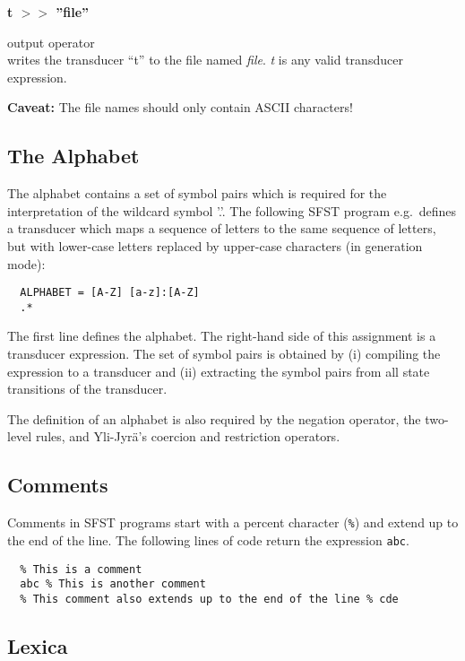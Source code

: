 \documentclass{article}
\begin{document}
\parbox[t]{2cm}{\textbf{t $>>$ ''file''}}
\begin{minipage}[t]{10cm}
  output operator\\
  writes the transducer ``t'' to the file named \emph{file}. \emph{t}
  is any valid transducer expression.
\end{minipage}

\textbf{Caveat:} The file names should only contain ASCII characters!

\subsection*{The Alphabet}

The alphabet contains a set of symbol pairs which is required for the
interpretation of the wildcard symbol '.'. The following SFST program
e.g.\ defines a transducer which maps a sequence of letters to the
same sequence of letters, but with lower-case letters replaced by
upper-case characters (in generation mode):

\begin{verbatim}
  ALPHABET = [A-Z] [a-z]:[A-Z]
  .*
\end{verbatim}

The first line defines the alphabet. The right-hand side of this
assignment is a transducer expression. The set of symbol pairs is
obtained by (i) compiling the expression to a transducer and (ii)
extracting the symbol pairs from all state transitions of the
transducer.

The definition of an alphabet is also required by the negation
operator, the two-level rules, and Yli-Jyr{\"a}'s coercion and
restriction operators.


\subsection*{Comments}

Comments in SFST programs start with a percent character (\verb#%#) and
extend up to the end of the line. The following lines of code return
the expression \verb#abc#.

\begin{verbatim}
  % This is a comment
  abc % This is another comment
  % This comment also extends up to the end of the line % cde 
\end{verbatim}


\subsection*{Lexica}
\end{document}
